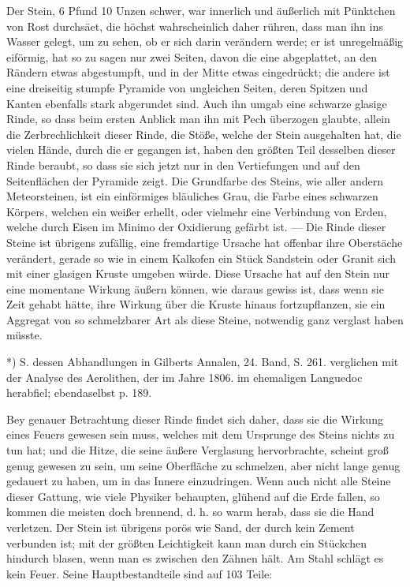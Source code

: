 \documentclass[a4paper, 11pt, oneside, polutonikogreek, german]{article}
\begin{document}
Der Stein, 6 Pfund 10 Unzen schwer, war innerlich und äußerlich mit Pünktchen von Rost durchsäet, die höchst wahrscheinlich daher rühren, dass man ihn ins Wasser gelegt, um zu sehen, ob er sich darin verändern werde; er ist unregelmäßig eiförmig, hat so zu sagen nur zwei Seiten, davon die eine abgeplattet, an den Rändern etwas abgestumpft, und in der Mitte etwas eingedrückt; die andere ist eine dreiseitig stumpfe Pyramide von ungleichen Seiten, deren Spitzen und Kanten ebenfalls stark abgerundet sind. Auch ihn umgab eine schwarze glasige Rinde, so dass beim ersten Anblick man ihn mit Pech überzogen glaubte, allein die Zerbrechlichkeit dieser Rinde, die Stöße, welche der Stein ausgehalten hat, die vielen Hände, durch die er gegangen ist, haben den größten Teil desselben dieser Rinde beraubt, so dass sie sich jetzt nur in den Vertiefungen und auf den Seitenflächen der Pyramide zeigt. Die Grundfarbe des Steins, wie aller andern Meteorsteinen, ist ein einförmiges bläuliches Grau, die Farbe eines schwarzen Körpers, welchen ein weißer erhellt, oder vielmehr eine Verbindung von Erden, welche durch Eisen im Minimo der Oxidierung gefärbt ist. --- Die Rinde dieser Steine ist übrigens zufällig, eine fremdartige Ursache hat offenbar ihre Oberstäche verändert, gerade so wie in einem Kalkofen ein Stück Sandstein oder Granit sich mit einer glasigen Kruste umgeben würde. Diese Ursache hat auf den Stein nur eine momentane Wirkung äußern können, wie daraus gewiss ist, dass wenn sie Zeit gehabt hätte, ihre Wirkung über die Kruste hinaus fortzupflanzen, sie ein Aggregat von so schmelzbarer Art als diese Steine, notwendig ganz verglast haben müsste.

*) S. dessen Abhandlungen in Gilberts Annalen, 24. Band, S. 261. verglichen mit der Analyse des Aerolithen, der im Jahre 1806. im ehemaligen Languedoc herabfiel; ebendaselbst p. 189.

Bey genauer Betrachtung dieser Rinde findet sich daher, dass sie die Wirkung eines Feuers gewesen sein muss, welches mit dem Ursprunge des Steins nichts zu tun hat; und die Hitze, die seine äußere Verglasung hervorbrachte, scheint groß genug gewesen zu sein, um seine Oberfläche zu schmelzen, aber nicht lange genug gedauert zu haben, um in das Innere einzudringen. Wenn auch nicht alle Steine dieser Gattung, wie viele Physiker behaupten, glühend auf die Erde fallen, so kommen die meisten doch brennend, d. h. so warm herab, dass sie die Hand verletzen. Der Stein ist übrigens porös wie Sand, der durch kein Zement verbunden ist; mit der größten Leichtigkeit kann man durch ein Stückchen hindurch blasen, wenn man es zwischen den Zähnen hält. Am Stahl schlägt es kein Feuer. Seine Hauptbestandteile sind auf 103 Teile:
\end{document}
